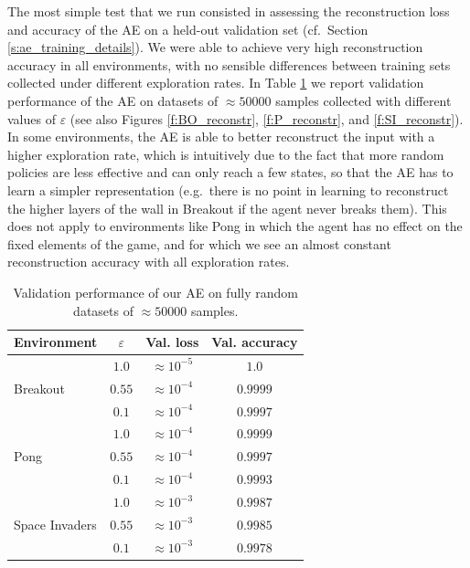 The most simple test that we run consisted in assessing the reconstruction loss
and accuracy of the AE on a held-out validation set (cf.\ Section \ref{s:ae_training_details}). 
We were able to achieve very high reconstruction accuracy in all environments, 
with no sensible differences between training sets collected under different 
exploration rates. In Table \ref{t:ae_training_precision} we report validation 
performance of the AE on datasets of $\approx50000$ samples collected with 
different values of $\varepsilon$ (see also Figures \ref{f:BO_reconstr}, 
\ref{f:P_reconstr}, and \ref{f:SI_reconstr}). 
In some environments, the AE is able to better reconstruct the input with a 
higher exploration rate, which is intuitively due to the fact that more random 
policies are less effective and can only reach a few states, so that the AE has
to learn a simpler representation (e.g.\ there is no point in learning to 
reconstruct the higher layers of the wall in Breakout if the agent never breaks 
them).
This does not apply to environments like Pong in which the agent has no effect 
on the fixed elements of the game, and for which we see an almost constant
reconstruction accuracy with all exploration rates. 
%
\begin{table}
    \centering
    \begin{tabular}{l c c c} 
	\hline
	Environment                     & $\varepsilon$ & Val. loss        & Val. accuracy \\ 
	\hline 
	\multirow{3}{*}{Breakout}       & $1.0$         & $\approx10^{-5}$ & $1.0$    \\
	                                & $0.55$        & $\approx10^{-4}$ & $0.9999$ \\
	                                & $0.1$         & $\approx10^{-4}$ & $0.9997$ \\
	\hline
	\multirow{3}{*}{Pong}           & $1.0$         & $\approx10^{-4}$ & $0.9999$ \\ 
	                                & $0.55$        & $\approx10^{-4}$ & $0.9997$ \\
	                                & $0.1$         & $\approx10^{-4}$ & $0.9993$    \\
	\hline
	\multirow{3}{*}{Space Invaders} & $1.0$         & $\approx10^{-3}$ & $0.9987$ \\
	                                & $0.55$        & $\approx10^{-3}$ & $0.9985$ \\
	                                & $0.1$         & $\approx10^{-3}$ & $0.9978$ \\
	\hline
    \end{tabular}
    \caption[AE validation performance]{Validation performance of our AE on
	     fully random datasets of $\approx50000$ samples.}
    \label{t:ae_training_precision}
\end{table}
